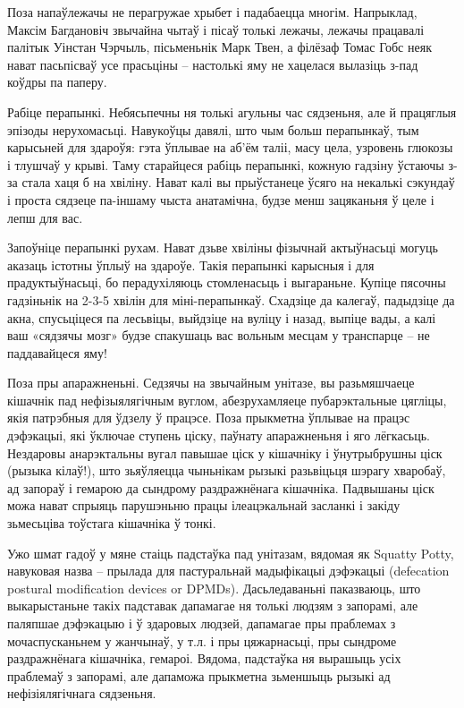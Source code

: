 Поза напаўлежачы не перагружае хрыбет і падабаецца многім. Напрыклад, Максім Багдановіч звычайна чытаў і пісаў толькі лежачы, лежачы працавалі палітык Уінстан Чэрчыль, пісьменьнік Марк Твен, а філёзаф Томас Гобс неяк нават пасьпісваў усе прасьціны – настолькі яму не хацелася вылазіць з-пад коўдры па паперу.

Рабіце перапынкі. Небясьпечны ня толькі агульны час сядзеньня, але й працяглыя эпізоды нерухомасьці. Навукоўцы давялі, што чым больш перапынкаў, тым карысьней для здароўя: гэта ўплывае на аб'ём таліі, масу цела, узровень глюкозы і тлушчаў у крыві. Таму старайцеся рабіць перапынкі, кожную гадзіну ўстаючы з-за стала хаця б на хвіліну. Нават калі вы прыўстанеце ўсяго на некалькі сэкундаў і проста сядзеце па-іншаму чыста анатамічна, будзе менш зацяканьня ў целе і лепш для вас.

Запоўніце перапынкі рухам. Нават дзьве хвіліны фізычнай актыўнасьці могуць аказаць істотны ўплыў на здароўе. Такія перапынкі карысныя і для прадуктыўнасьці, бо перадухіляюць стомленасьць і выгараньне. Купіце пясочны гадзіньнік на 2-3-5 хвілін для міні-перапынкаў. Схадзіце да калегаў, падыдзіце да акна, спусьціцеся па лесьвіцы, выйдзіце на вуліцу і назад, выпіце вады, а калі ваш «сядзячы мозг» будзе спакушаць вас вольным месцам у транспарце – не паддавайцеся яму!

Поза пры апаражненьні. Седзячы на звычайным унітазе, вы разьмяшчаеце кішачнік пад нефізыялягічным вуглом, абезрухамляеце пубарэктальные цягліцы, якія патрэбныя для ўдзелу ў працэсе. Поза прыкметна ўплывае на працэс дэфэкацыі, які ўключае ступень ціску, паўнату апаражненьня і яго лёгкасьць. Нездаровы анарэктальны вугал павышае ціск у кішачніку і ўнутрыбрушны ціск (рызыка кілаў!), што зьяўляецца чыньнікам рызыкі разьвіцьця шэрагу хваробаў, ад запораў і гемарою да сындрому раздражнёнага кішачніка. Падвышаны ціск можа нават спрыяць парушэньню працы ілеацэкальнай засланкі і закіду зьмесьціва тоўстага кішачніка ў тонкі.

Ужо шмат гадоў у мяне стаіць падстаўка пад унітазам, вядомая як Squatty Potty, навуковая назва – прылада для пастуральнай мадыфікацыі дэфэкацыі (defecation postural modification devices or DPMDs). Дасьледаваньні паказваюць, што выкарыстаньне такіх падставак дапамагае ня толькі людзям з запорамі, але паляпшае дэфэкацыю і ў здаровых людзей, дапамагае пры праблемах з мочаспусканьнем у жанчынаў, у т.л. і пры цяжарнасьці, пры сындроме раздражнёнага кішачніка, гемароі. Вядома, падстаўка ня вырашыць усіх праблемаў з запорамі, але дапаможа прыкметна зьменшыць рызыкі ад нефізіялягічнага сядзеньня.


